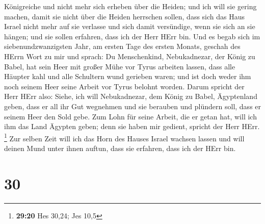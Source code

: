 Königreiche und nicht mehr sich erheben über die Heiden; und ich will
sie gering machen, damit sie nicht über die Heiden herrschen sollen,
 dass sich das Haus Israel nicht mehr auf sie verlasse
und sich damit versündige, wenn sie sich an sie hängen; und sie sollen
erfahren, dass ich der Herr HErr bin.  Und es begab sich
im siebenundzwanzigsten Jahr, am ersten Tage des ersten Monats, geschah
des HErrn Wort zu mir und sprach:  Du Menschenkind,
Nebukadnezar, der König zu Babel, hat sein Heer mit großer Mühe vor
Tyrus arbeiten lassen, dass alle Häupter kahl und alle Schultern wund
gerieben waren; und ist doch weder ihm noch seinem Heer seine Arbeit vor
Tyrus belohnt worden.  Darum spricht der Herr HErr also:
Siehe, ich will Nebukadnezar, dem König zu Babel, Ägyptenland geben,
dass er all ihr Gut wegnehmen und sie berauben und plündern soll, dass
er seinem Heer den Sold gebe.  Zum Lohn für seine Arbeit,
die er getan hat, will ich ihm das Land Ägypten geben; denn sie haben
mir gedient, spricht der Herr HErr. \footnote{\textbf{29:20} Hes 30,24;
  Jes 10,5}  Zur selben Zeit will ich das Horn des Hauses
Israel wachsen lassen und will deinen Mund unter ihnen auftun, dass sie
erfahren, dass ich der HErr bin.

\hypertarget{section-29}{%
\section{30}\label{section-29}}

